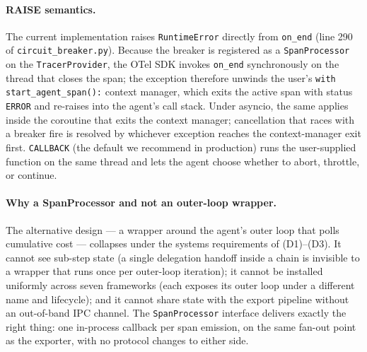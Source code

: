 \documentclass[sigplan,10pt,anonymous,review]{acmart}
\begin{document}
\paragraph{RAISE semantics.} The current implementation raises
\texttt{RuntimeError} directly from \texttt{on\_end} (line 290 of
\texttt{circuit\_breaker.py}). Because the breaker is registered as a
\texttt{SpanProcessor} on the \texttt{TracerProvider}, the OTel SDK
invokes \texttt{on\_end} synchronously on the thread that closes the
span; the exception therefore unwinds the user's
\texttt{with start\_agent\_span():} context manager, which exits the
active span with status \texttt{ERROR} and re-raises into the agent's
call stack. Under asyncio, the same applies inside the coroutine that
exits the context manager; cancellation that races with a breaker fire
is resolved by whichever exception reaches the context-manager exit
first. \texttt{CALLBACK} (the default we recommend in production) runs
the user-supplied function on the same thread and lets the agent
choose whether to abort, throttle, or continue.

\paragraph{Why a SpanProcessor and not an outer-loop wrapper.} The
alternative design --- a wrapper around the agent's outer loop that
polls cumulative cost --- collapses under the systems requirements of
(D1)--(D3). It cannot see sub-step state (a single delegation handoff
inside a chain is invisible to a wrapper that runs once per outer-loop
iteration); it cannot be installed uniformly across seven frameworks
(each exposes its outer loop under a different name and lifecycle);
and it cannot share state with the export pipeline without an
out-of-band IPC channel. The \texttt{SpanProcessor} interface delivers
exactly the right thing: one in-process callback per span emission,
on the same fan-out point as the exporter, with no protocol changes
to either side.
\end{document}
